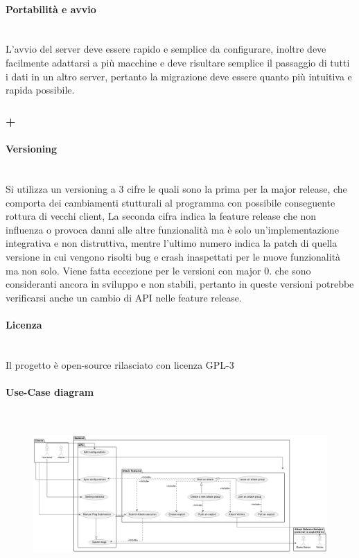 \documentclass[11pt]{article}
\begin{document}
\paragraph{Portabilità e avvio}\mbox{}\\
L'avvio del server deve essere rapido e semplice da configurare, inoltre deve facilmente adattarsi a più macchine e deve risultare semplice il passaggio di tutti i dati in un altro server, pertanto la migrazione deve essere quanto più intuitiva e rapida possibile.
\subsubsection{+}
\paragraph{Versioning}\mbox{}\\
Si utilizza un versioning a 3 cifre le quali sono la prima per la major release, che comporta dei cambiamenti stutturali al programma con possibile conseguente rottura di vecchi client, La seconda cifra indica la feature release che non influenza o provoca danni alle altre funzionalità ma è solo un'implementazione integrativa e non distruttiva, mentre l'ultimo numero indica la patch di quella versione in cui vengono risolti bug e crash inaspettati per le nuove funzionalità ma non solo.
Viene fatta eccezione per le versioni con major 0. che sono consideranti ancora in sviluppo e non stabili, pertanto in queste versioni potrebbe verificarsi anche un cambio di API nelle feature release.
\paragraph{Licenza}\mbox{}\\
Il progetto è open-source rilasciato con licenza GPL-3
\paragraph{Use-Case diagram}\mbox{}\\
    \begin{figure}[H]
    	\centering
    	\includegraphics[width=1\textwidth]{general_use_case.png}
	\end{figure}
\end{document}
